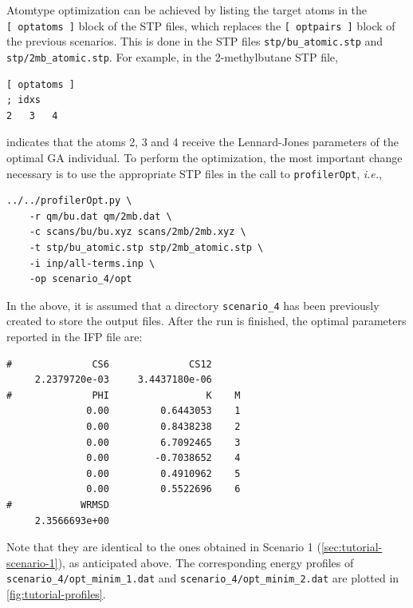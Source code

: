 \documentclass[10pt,a4paper,openany]{memoir}
\numberwithin{equation}{section}
\newcommand{\under}{\_}
\newcommand{\profileropt}[0]{\texttt{profilerOpt}}
\begin{document}
Atomtype optimization can be achieved by listing the target atoms in
the \texttt{[~optatoms~]} block of the STP files, which replaces the
\texttt{[~optpairs~]} block of the previous scenarios.
%
This is done in the STP files \texttt{stp/bu\under{}atomic.stp} and
\texttt{stp/2mb\under{}atomic.stp}.
%
For example, in the 2-methylbutane STP file,

\begin{lstlisting}[language=gromacs]
[ optatoms ]
; idxs
2   3   4
\end{lstlisting}\vspace{1ex}\par

\noindent indicates that the atoms 2, 3 and 4 receive the
Lennard-Jones parameters of the optimal GA individual.
%
To perform the optimization, the most important change necessary is to
use the appropriate STP files in the call to \profileropt,
\textit{i.e.},

\begin{lstlisting}
../../profilerOpt.py \
    -r qm/bu.dat qm/2mb.dat \
    -c scans/bu/bu.xyz scans/2mb/2mb.xyz \
    -t stp/bu_atomic.stp stp/2mb_atomic.stp \
    -i inp/all-terms.inp \
    -op scenario_4/opt
\end{lstlisting}\vspace{1ex}\par

\noindent In the above, it is assumed that a directory
\texttt{scenario\under{}4} has been previously created to store the
output files.
%
After the run is finished, the optimal parameters reported in the IFP
file are:

\begin{lstlisting}
#              CS6              CS12
     2.2379720e-03     3.4437180e-06
#              PHI                 K    M
              0.00         0.6443053    1
              0.00         0.8438238    2
              0.00         6.7092465    3
              0.00        -0.7038652    4
              0.00         0.4910962    5
              0.00         0.5522696    6
#            WRMSD
     2.3566693e+00
\end{lstlisting}\vspace{1ex}\par

\noindent Note that they are identical to the ones obtained in
Scenario 1 (\autoref{sec:tutorial-scenario-1}), as anticipated above.
%
The corresponding energy profiles of
\texttt{scenario\under{}4/opt\under{}minim\under{}1.dat} and
\texttt{scenario\under{}4/opt\under{}minim\under{}2.dat} are plotted
in \autoref{fig:tutorial-profiles}.
\end{document}

